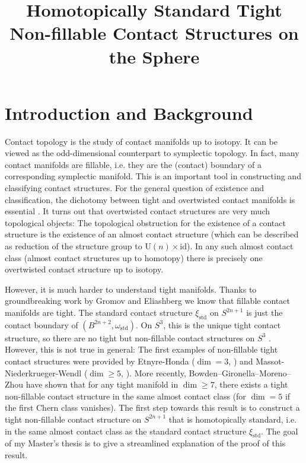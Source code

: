 \documentclass{amsart}
\begin{document}
\title[Homotopically Standard Tight Non-fillable Contact Structures]{Homotopically Standard Tight Non-fillable Contact Structures on the Sphere}
\maketitle
\section*{Introduction and Background}
\noindent Contact topology is the study of contact manifolds up to isotopy. It can be viewed as the
odd-dimensional counterpart to symplectic topology.
In fact, many contact manifolds are fillable, i.e. they are the (contact) boundary of a 
corresponding symplectic  manifold. This is an important tool in constructing and 
classifying contact structures.
For the general question of existence and classification, the dichotomy between tight and 
overtwisted contact manifolds is essential \cite{Eliashberg89,BEM15}.
It turns out that overtwisted contact structures are very much topological objects:
The topological obstruction for the existence of a contact structure is the existence of
an almost contact structure (which can be described as reduction of the structure group to 
$\mathrm U(n) \times \mathrm{id}$). 
In any such almost contact class (almost contact structures up to homotopy) 
there is precisely one overtwisted contact structure up to isotopy.

However, it is much harder to understand tight manifolds.
Thanks to groundbreaking work by Gromov and Eliashberg \cite{Gromov85,Eliashberg91} 
we know that fillable contact manifolds are tight. The standard contact structure 
$\xi_\mathrm{std}$ on $S^{2n+1}$ is just the contact boundary of $(B^{2n+2}, \omega_\mathrm{std})$.
On $S^3$, this is the unique tight contact structure, so there are no tight but non-fillable 
contact structures on $S^3$ \cite{Eliashberg92}. However, this is not true in general:
The first examples of non-fillable tight contact structures were provided by
Etnyre-Honda ($\dim = 3$, \cite{EH02}) and Massot-Niederkrueger-Wendl ($\dim \ge 5$, \cite{MNW13}).
More recently, Bowden--Gironella--Moreno--Zhou \cite{BGMZ22} have shown that for any
tight manifold in $\dim \ge 7$, there exists a tight non-fillable contact structure in
the same almost contact class (for $\dim = 5$ if the first Chern class vanishes). 
The first step towards this result is to construct a tight non-fillable contact structure
on $S^{2n+1}$ that is homotopically standard, i.e. in the same almost contact class
as the standard contact structure $\xi_\mathrm{std}$.
The goal of my Master's thesis is to give a streamlined explanation of the proof of this result.
\end{document}
